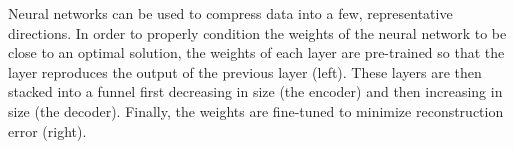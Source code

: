 Neural networks can be used to compress data into a few, representative directions. In order to properly condition the weights of the neural network to be close to an optimal solution, the weights of each layer are pre-trained so that the layer reproduces the output of the previous layer (left). These layers are then stacked into a funnel first decreasing in size (the encoder) and then increasing in size (the decoder). Finally, the weights are fine-tuned to minimize reconstruction error (right).